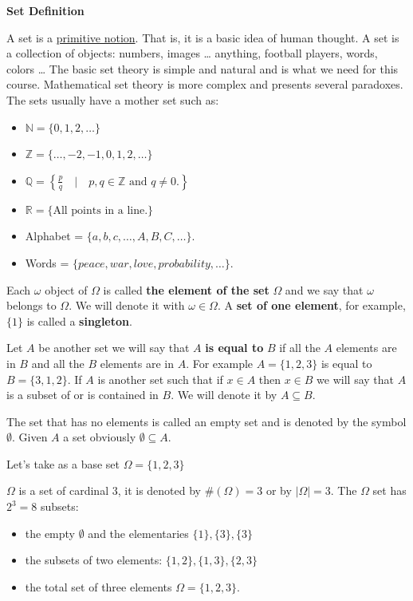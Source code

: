 \documentclass[
]{book}
\providecommand{\tightlist}{%
  \setlength{\itemsep}{0pt}\setlength{\parskip}{0pt}}
\theoremstyle{definition}
\theoremstyle{definition}
\theoremstyle{definition}
\theoremstyle{definition}
\theoremstyle{remark}
\begin{document}
\textbf{Set Definition}

A set is a \href{https://en.wikipedia.org/wiki/Primitive_notion}{primitive notion}. That is, it is a basic idea of human thought. A set is a collection of objects: numbers, images \ldots{} anything, football players, words, colors \ldots{} The basic set theory is simple and natural and is what we need for this course. Mathematical set theory is more complex and presents several paradoxes. The sets usually have a mother set such as:

\begin{itemize}
\tightlist
\item
  \(\mathbb{N}=\{0,1,2,\ldots\}\)
\item
  \(\mathbb{Z}=\{\ldots,-2,-1,0,1,2,\ldots\}\)
\item
  \(\mathbb{Q}=\left\{\frac{p}{q}\quad\Big|\quad p,q\in \mathbb{Z} \mbox{ and } q \not= 0.\right\}\)
\item
  \(\mathbb{R}=\{\mbox{All points in a line.}\}\)
\item
  Alphabet = \(\{a,b,c,\ldots, A,B,C,\ldots\}.\)
\item
  Words = \(\{peace, war, love, probability,\ldots\}.\)
\end{itemize}

Each \(\omega\) object of \(\Omega\) is called \textbf{the element of the set} \(\Omega\) and we say that \(\omega\) belongs to \(\Omega\). We will denote it with \(\omega\in \Omega\). A \textbf{set of one element}, for example, \(\{1\}\) is called a \textbf{singleton}.

Let \(A\) be another set we will say that \(A\) \textbf{is equal to} \(B\) if all the \(A\) elements are in \(B\) and all the \(B\) elements are in \(A\). For example \(A=\{1,2,3\}\) is equal to \(B=\{3,1,2\}\). If \(A\) is another set such that if \(x\in A\) then \(x\in B\) we will say that \(A\) is a subset of or is contained in \(B\). We will denote it by \(A\subseteq B.\)

The set that has no elements is called an empty set and is denoted by the symbol \(\emptyset\). Given \(A\) a set obviously \(\emptyset\subseteq A.\)

Let's take as a base set \(\Omega=\{1,2,3\}\)

\(\Omega\) is a set of cardinal 3, it is denoted by \(\#(\Omega)=3\) or by \(|\Omega|=3\). The \(\Omega\) set has \(2^3=8\) subsets:

\begin{itemize}
\tightlist
\item
  the empty \(\emptyset\) and the elementaries \(\{1\},\{3\},\{3\}\)
\item
  the subsets of two elements: \(\{1,2\},\{1,3\},\{2,3\}\)
\item
  the total set of three elements \(\Omega=\{1,2,3\}.\)
\end{itemize}
\end{document}
